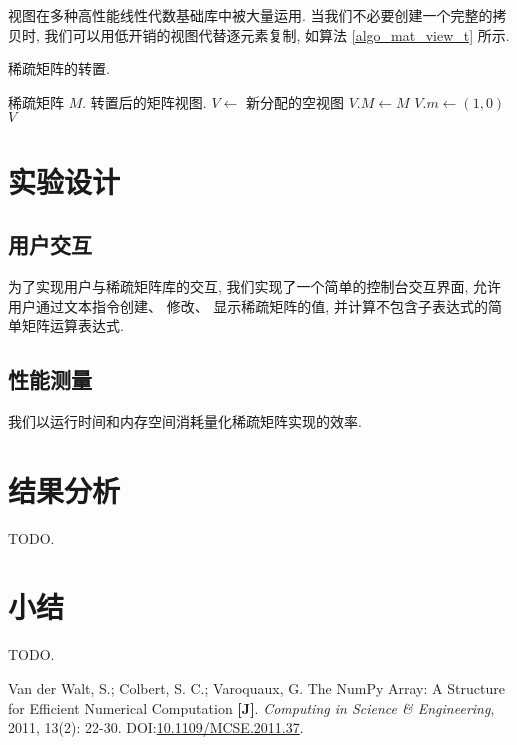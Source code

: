 视图在多种高性能线性代数基础库中被大量运用\cite{bib_numpy}. 当我们不必要创建一个完整的拷贝时, 我们可以用低开销的视图代替逐元素复制, 如算法 \ref{algo_mat_view_t} 所示.
\begin{breakablealgorithm}
\caption{稀疏矩阵的转置.}
\label{algo_mat_view_t}
\begin{algorithmic}[1]
\Require 稀疏矩阵 $M.$
\Ensure 转置后的矩阵视图.
    \State $V \gets$ 新分配的空视图
    \State $V.M \gets M$
    \State $V.m \gets (1, 0)$
    \State \Return $V$
\EndFunction
\end{algorithmic}
\end{breakablealgorithm}

\section{实验设计}

\subsection{用户交互}

为了实现用户与稀疏矩阵库的交互, 我们实现了一个简单的控制台交互界面, 允许用户通过文本指令创建、 修改、 显示稀疏矩阵的值, 并计算不包含子表达式的简单矩阵运算表达式.

\subsection{性能测量}

我们以运行时间和内存空间消耗量化稀疏矩阵实现的效率.

\section{结果分析}

TODO.

\section{小结}

TODO.

\begin{thebibliography}{}

 Van der Walt, S.; Colbert, S. C.; Varoquaux, G. The NumPy Array: A Structure for Efficient Numerical Computation \textbf{[J]}. \textit{Computing in Science \& Engineering}, 2011, 13(2): 22-30. DOI:\href{https://doi.org/10.1109/MCSE.2011.37}{10.1109/MCSE.2011.37}.

\end{thebibliography}

